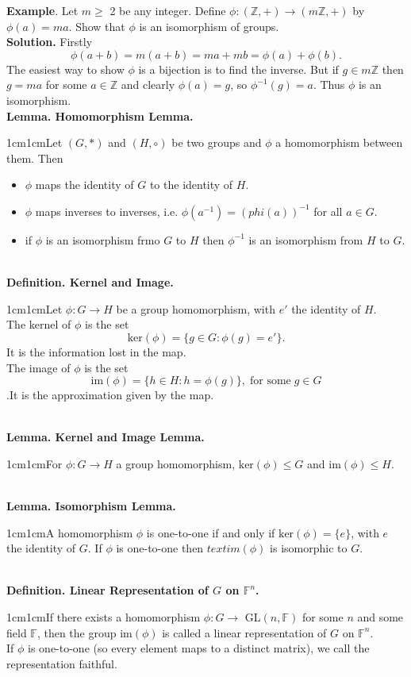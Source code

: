 \documentclass{article}
\newcommand{\definition}[2]{\textbf{Definition. #1.}\begin{adjustwidth}{1cm}{1cm}#2\end{adjustwidth}}
\newcommand{\lemma}[2]{\textbf{Lemma. #1.}\begin{adjustwidth}{1cm}{1cm}#2\end{adjustwidth}}
\begin{document}
\textbf{Example}. Let $m \geq$ 2 be any integer. Define $\phi: (\mathbb{Z},+) \rightarrow (m\mathbb{Z},+)$ by $\phi(a) = ma$. Show that $\phi$ is an isomorphism of groups.\\
\textbf{Solution.} Firstly \[\phi(a+b)=m(a+b)=ma+mb=\phi(a)+\phi(b).\]The easiest way to show $\phi$ is a bijection is to find the inverse. But if $g \in m\mathbb{Z}$ then $g=ma$ for some $a \in \mathbb{Z}$ and clearly $\phi(a) = g$, so $\phi^{-1}(g) = a$. Thus $\phi$ is an isomorphism.\\[1\baselineskip]
\lemma{Homomorphism Lemma}{Let $(G, *)$ and $(H, \circ)$ be two groups and $\phi$ a homomorphism between them. Then \begin{itemize}\item $\phi$ maps the identity of $G$ to the identity of $H$.\item $\phi$ maps inverses to inverses, i.e. $\phi(a^{-1})=(phi(a))^{-1}$ for all $a \in G$.\item if $\phi$ is an isomorphism frmo $G$ to $H$ then $\phi^{-1}$ is an isomorphism from $H$ to $G$.\end{itemize}}~\\
\definition{Kernel and Image}{Let $\phi : G \rightarrow H$ be a group homomorphism, with $e'$ the identity of $H$.\\The kernel of $\phi$ is the set \[\text{ker}(\phi) = \{g \in G: \phi(g) = e' \}.\]It is the information lost in the map.\\The image of $\phi$ is the set \[\text{im}(\phi) = \{h \in H : h = \phi(g)\}, \; \text{for some} \; g \in G\].It is the approximation given by the map.}~\\
\lemma{Kernel and Image Lemma}{For $\phi : G \rightarrow H$ a group homomorphism, $\text{ker}(\phi) \leq G$ and $\text{im}(\phi) \leq H$.}~\\
\lemma{Isomorphism Lemma}{A homomorphism $\phi$ is one-to-one if and only if $\text{ker}(\phi) = \{e\}$, with $e$ the identity of $G$. If $\phi$ is one-to-one then $text{im}(\phi)$ is isomorphic to $G$.}~\\
\definition{Linear Representation of $G$ on $\mathbb{F}^n$}{If there exists a homomorphism $\phi : G \rightarrow$ GL$(n, \mathbb{F})$ for some $n$ and some field $\mathbb{F}$, then the group im$(\phi)$ is called a linear representation of $G$ on $\mathbb{F}^n$.\\If $\phi$ is one-to-one (so every element maps to a distinct matrix), we call the representation faithful.}~\\
\end{document}
